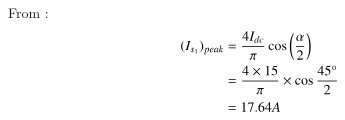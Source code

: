 \documentclass[journal,12pt,onecolumn]{IEEEtran}
\theoremstyle{remark}
\begin{document}
\begin{figure}[!h]
    \centering
    
\end{figure}
\begin{figure}[!h]
    \centering
    
\end{figure}
\begin{figure}[!h]
    \centering
    
\end{figure}
\begin{figure}[!h]
    \centering
    
\end{figure}

From :
\begin{align}
   (I_{s_1})_{peak} &= \frac{4I_{dc}}{\pi}\cos{\left(\frac{\alpha}{2}\right)}\\
    &= \frac{4 \times 15 }{\pi}\times \cos{\frac{45 \degree}{2}}\\
    &=17.64 A 
\end{align}
 
\end{document}
